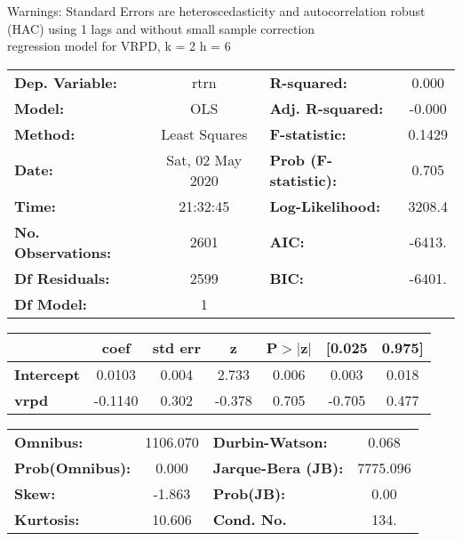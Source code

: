 Warnings: \newline
 [1] Standard Errors are heteroscedasticity and autocorrelation robust (HAC) using 1 lags and without small sample correction\\ 

regression model for VRPD, k = 2 h = 6\begin{center}
\begin{tabular}{lclc}
\toprule
\textbf{Dep. Variable:}    &       rtrn       & \textbf{  R-squared:         } &     0.000   \\
\textbf{Model:}            &       OLS        & \textbf{  Adj. R-squared:    } &    -0.000   \\
\textbf{Method:}           &  Least Squares   & \textbf{  F-statistic:       } &    0.1429   \\
\textbf{Date:}             & Sat, 02 May 2020 & \textbf{  Prob (F-statistic):} &    0.705    \\
\textbf{Time:}             &     21:32:45     & \textbf{  Log-Likelihood:    } &    3208.4   \\
\textbf{No. Observations:} &        2601      & \textbf{  AIC:               } &    -6413.   \\
\textbf{Df Residuals:}     &        2599      & \textbf{  BIC:               } &    -6401.   \\
\textbf{Df Model:}         &           1      & \textbf{                     } &             \\
\bottomrule
\end{tabular}
\begin{tabular}{lcccccc}
                   & \textbf{coef} & \textbf{std err} & \textbf{z} & \textbf{P$> |$z$|$} & \textbf{[0.025} & \textbf{0.975]}  \\
\midrule
\textbf{Intercept} &       0.0103  &        0.004     &     2.733  &         0.006        &        0.003    &        0.018     \\
\textbf{vrpd}      &      -0.1140  &        0.302     &    -0.378  &         0.705        &       -0.705    &        0.477     \\
\bottomrule
\end{tabular}
\begin{tabular}{lclc}
\textbf{Omnibus:}       & 1106.070 & \textbf{  Durbin-Watson:     } &    0.068  \\
\textbf{Prob(Omnibus):} &   0.000  & \textbf{  Jarque-Bera (JB):  } & 7775.096  \\
\textbf{Skew:}          &  -1.863  & \textbf{  Prob(JB):          } &     0.00  \\
\textbf{Kurtosis:}      &  10.606  & \textbf{  Cond. No.          } &     134.  \\
\bottomrule
\end{tabular}
\end{center}

